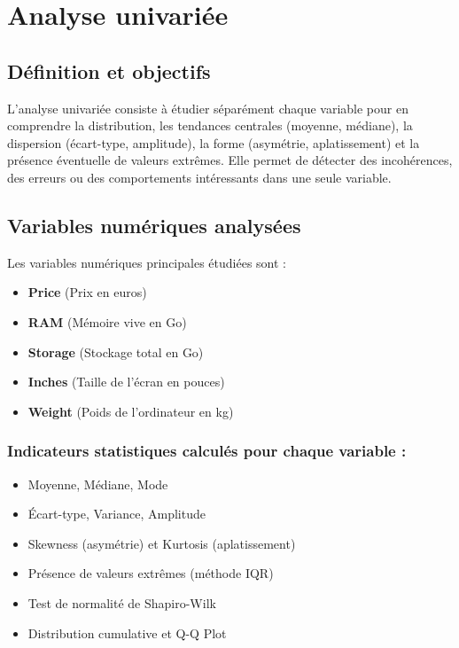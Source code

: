 \documentclass[12pt]{report}
\begin{document}
\chapter{Analyse univariée}

\section{Définition et objectifs}
L'analyse univariée consiste à étudier séparément chaque variable pour en comprendre la distribution, les tendances centrales (moyenne, médiane), la dispersion (écart-type, amplitude), la forme (asymétrie, aplatissement) et la présence éventuelle de valeurs extrêmes. Elle permet de détecter des incohérences, des erreurs ou des comportements intéressants dans une seule variable.

\section{Variables numériques analysées}
Les variables numériques principales étudiées sont :

\begin{itemize}
    \item \textbf{Price} (Prix en euros)
    \item \textbf{RAM} (Mémoire vive en Go)
    \item \textbf{Storage} (Stockage total en Go)
    \item \textbf{Inches} (Taille de l’écran en pouces)
    \item \textbf{Weight} (Poids de l’ordinateur en kg)
\end{itemize}

\subsection*{Indicateurs statistiques calculés pour chaque variable :}
\begin{itemize}
    \item Moyenne, Médiane, Mode
    \item Écart-type, Variance, Amplitude
    \item Skewness (asymétrie) et Kurtosis (aplatissement)
    \item Présence de valeurs extrêmes (méthode IQR)
    \item Test de normalité de Shapiro-Wilk
    \item Distribution cumulative et Q-Q Plot
\end{itemize}
\end{document}
